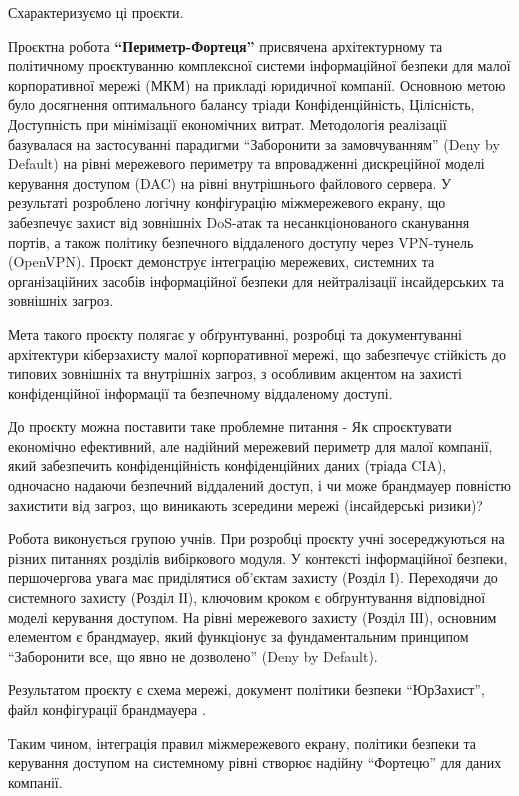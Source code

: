 Схарактеризуємо ці проєкти.

Проєктна робота \textbf{``Периметр-Фортеця''}  присвячена архітектурному та політичному проєктуванню комплексної системи інформаційної безпеки для малої корпоративної мережі (МКМ) на прикладі юридичної компанії. Основною метою було досягнення оптимального балансу тріади Конфіденційність, Цілісність, Доступність при мінімізації економічних витрат. Методологія реалізації базувалася на застосуванні парадигми ``Заборонити за замовчуванням'' (Deny by Default) на рівні мережевого периметру та впровадженні дискреційної моделі керування доступом (DAC) на рівні внутрішнього файлового сервера. У результаті розроблено логічну конфігурацію міжмережевого екрану, що забезпечує захист від зовнішніх DoS-атак та несанкціонованого сканування портів, а також політику безпечного віддаленого доступу через VPN-тунель (OpenVPN). Проєкт демонструє інтеграцію мережевих, системних та організаційних засобів інформаційної безпеки для нейтралізації інсайдерських та зовнішніх загроз.

Мета такого проєкту полягає у обґрунтуванні, розробці та документуванні архітектури кіберзахисту малої корпоративної мережі, що забезпечує стійкість до типових зовнішніх та внутрішніх загроз, з особливим акцентом на захисті конфіденційної інформації та безпечному віддаленому доступі.

До проєкту можна поставити таке проблемне питання - Як спроєктувати економічно ефективний, але надійний мережевий периметр для малої компанії, який забезпечить конфіденційність конфіденційних даних (тріада CIA), одночасно надаючи безпечний віддалений доступ, і чи може брандмауер повністю захистити від загроз, що виникають зсередини мережі (інсайдерські ризики)?

Робота виконується групою учнів. При розробці проєкту учні зосереджуються на різних питаннях розділів вибіркового модуля. У контексті інформаційної безпеки, першочергова увага має приділятися об'єктам захисту (Розділ І). Переходячи до системного захисту (Розділ ІІ), ключовим кроком є обґрунтування відповідної моделі керування доступом. На рівні мережевого захисту (Розділ ІІІ), основним елементом є брандмауер, який функціонує за фундаментальним принципом ``Заборонити все, що явно не дозволено'' (Deny by Default). 

Результатом проєкту  є схема мережі, документ політики безпеки ``ЮрЗахист'', файл конфігурації брандмауера .

Таким чином, інтеграція правил міжмережевого екрану, політики безпеки та керування доступом на системному рівні створює надійну ``Фортецю'' для даних компанії.

